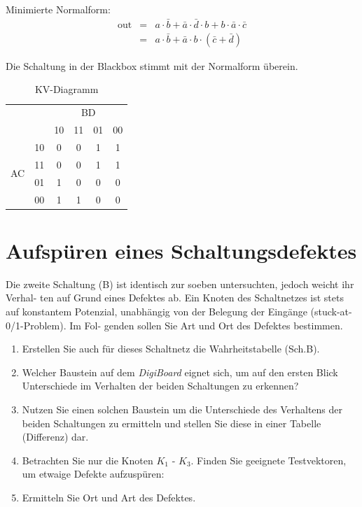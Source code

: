 \documentclass[10pt]{scrreprt}
\begin{document}
    Minimierte Normalform:
    \begin{eqnarray*}
        \text{out} &=& a\cdot \bar{b} + \bar{a} \cdot \bar{d} \cdot b + b \cdot \bar{a} \cdot \bar{c}\\
            &=& a \cdot \bar{b} + \bar{a} \cdot b \cdot (\bar{c} + \bar{d})
    \end{eqnarray*}

    Die Schaltung in der Blackbox stimmt mit der Normalform überein.

    \begin{table}
        \centering
        \begin{tabular}{cc|cccc}
            & &  & \multicolumn{2}{c}{BD}\\
            & & 10 & 11 & 01 & 00\\
            \midrule
             & 10 & 0 & 0 & 1 & 1\\
            \multirow{ 2}{*}{AC} & 11 & 0 & 0 & 1 & 1\\
             & 01 & 1 & 0 & 0 & 0\\
             & 00 & 1 & 1 & 0 & 0
        \end{tabular}
        \caption{KV-Diagramm}
    \end{table}


    \section{Aufspüren eines Schaltungsdefektes}
    Die zweite Schaltung (B) ist identisch zur soeben untersuchten, jedoch weicht ihr Verhal-
    ten auf Grund eines Defektes ab. Ein Knoten des Schaltnetzes ist stets auf konstantem
    Potenzial, unabhängig von der Belegung der Eingänge (stuck-at-0/1-Problem). Im Fol-
    genden sollen Sie Art und Ort des Defektes bestimmen.
    \begin{enumerate}
        \item Erstellen Sie auch für dieses Schaltnetz die Wahrheitstabelle (Sch.B).
        \item Welcher Baustein auf dem \textit{DigiBoard} eignet sich, um auf den ersten Blick
            Unterschiede im Verhalten der beiden Schaltungen zu erkennen?
        \item Nutzen Sie einen solchen Baustein um die Unterschiede des Verhaltens der beiden
            Schaltungen zu ermitteln und stellen Sie diese in einer Tabelle (Differenz) dar.
        \item Betrachten Sie nur die Knoten $K_1$ - $K_3$. Finden Sie geeignete Testvektoren, um
            etwaige Defekte aufzuspüren:
        \item Ermitteln Sie Ort und Art des Defektes.
    \end{enumerate}
\end{document}
